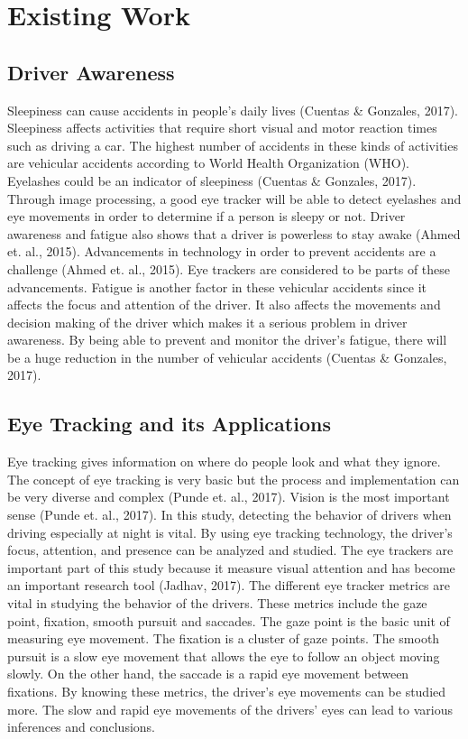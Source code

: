 \section{Existing Work}
\subsection{Driver Awareness}
Sleepiness can cause accidents in people’s daily lives (Cuentas \& Gonzales, 2017). Sleepiness affects activities that require short visual and motor reaction times such as driving a car. The highest number of accidents in these kinds of activities are vehicular accidents according to World Health Organization (WHO). Eyelashes could be an indicator of sleepiness (Cuentas \& Gonzales, 2017). Through image processing, a good eye tracker will be able to detect eyelashes and eye movements in order to determine if a person is sleepy or not. Driver awareness and fatigue also shows that a driver is powerless to stay awake (Ahmed et. al., 2015). Advancements in technology in order to prevent accidents are a challenge (Ahmed et. al., 2015). Eye trackers are considered to be parts of these advancements. Fatigue is another factor in these vehicular accidents since it affects the focus and attention of the driver. It also affects the movements and decision making of the driver which makes it a serious problem in driver awareness. By being able to prevent and monitor the driver’s fatigue, there will be a huge reduction in the number of vehicular accidents (Cuentas \& Gonzales, 2017).

\subsection{Eye Tracking and its Applications}
Eye tracking gives information on where do people look and what they ignore. The concept of eye tracking is very basic but the process and implementation can be very diverse and complex (Punde et. al., 2017). Vision is the most important sense (Punde et. al., 2017). In this study, detecting the behavior of drivers when driving especially at night is vital. By using eye tracking technology, the driver’s focus, attention, and presence can be analyzed and studied. The eye trackers are important part of this study because it measure visual attention and has become an important research tool (Jadhav, 2017). The different eye tracker metrics are vital in studying the behavior of the drivers. These metrics include the gaze point, fixation, smooth pursuit and saccades. The gaze point is the basic unit of measuring eye movement. The fixation is a cluster of gaze points. The smooth pursuit is a slow eye movement that allows the eye to follow an object moving slowly. On the other hand, the saccade is a rapid eye movement between fixations. By knowing these metrics, the driver’s eye movements can be studied more. The slow and rapid eye movements of the drivers’ eyes can lead to various inferences and conclusions.
\newline 

